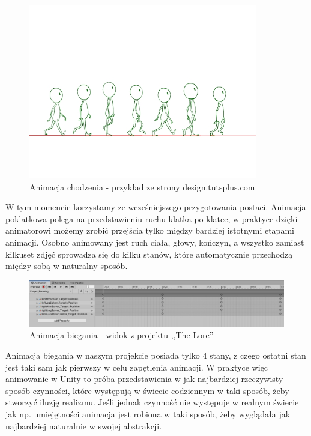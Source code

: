 \documentclass[oneside,polski,logo]{amuthesis}
\begin{document}
\begin{figure}[h]
	\centering
	\includegraphics[width=10cm]{images/kozubal/walkingAnimation.jpg}
	\caption{Animacja chodzenia - przykład ze strony design.tutsplus.com \cite{animation2}}
\end{figure}

\newpage W tym momencie korzystamy ze wcześniejszego przygotowania postaci. Animacja poklatkowa polega na przedstawieniu ruchu klatka po klatce, w praktyce dzięki animatorowi możemy zrobić przejścia tylko między bardziej istotnymi etapami animacji. Osobno animowany jest ruch ciała, głowy, kończyn, a wszystko zamiast kilkuset zdjęć sprowadza się do kilku stanów, które automatycznie przechodzą między sobą w naturalny sposób.

\begin{figure}[h]
	\centering
	\includegraphics[width=13cm]{images/kozubal/runningAnimation.jpg}
	\caption{Animacja biegania - widok z projektu ,,The Lore''}
\end{figure}

Animacja biegania w naszym projekcie posiada tylko 4 stany, z czego ostatni stan jest taki sam jak pierwszy w celu zapętlenia animacji. W praktyce więc animowanie w Unity to próba przedstawienia w jak najbardziej rzeczywisty sposób czynności, które występują w świecie codziennym w taki sposób, żeby stworzyć iluzję realizmu. Jeśli jednak czynność nie występuje w realnym świecie jak np. umiejętności animacja jest robiona w taki sposób, żeby wyglądała jak najbardziej naturalnie w swojej abstrakcji.
\end{document}
